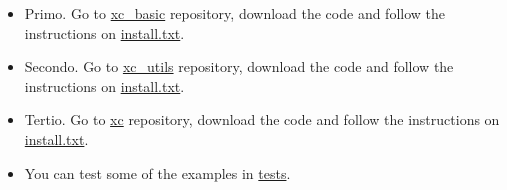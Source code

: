 \begin{itemize}
\item Primo. Go to \href{https://github.com/xcfem/xc_basic}{xc\_basic} repository, download the code and follow the instructions on \href{https://github.com/xcfem/xc_basic/blob/master/install.txt}{install.txt}.
\item Secondo. Go to \href{https://github.com/xcfem/xc_utils}{xc\_utils} repository, download the code and follow the instructions on \href{https://github.com/xcfem/xc_utils/blob/master/install.txt}{install.txt}.
\item Tertio. Go to \href{https://github.com/xcfem/xc}{xc} repository, download the code and follow the instructions on \href{https://github.com/xcfem/xc/blob/master/install.txt}{install.txt}.
\item You can test some of the examples in \href{https://github.com/xcfem/xc/tree/master/verif/tests}{tests}.
\end{itemize}






